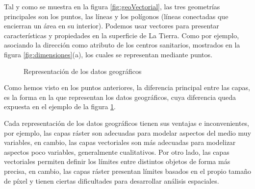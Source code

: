 \begin{itemize}
  Tal y como se muestra en la figura \ref{fig:geoVectorial}, las tres geometrías principales son los puntos, las líneas y los polígonos (líneas conectadas que encierran un área en su interior).
  Podemos usar vectores para presentar características y propiedades en la superficie de La Tierra.
  Como por ejemplo, asociando la dirección como atributo de los centros sanitarios, mostrados en la figura \ref{fig:dimensiones}(a), los cuales se representan mediante puntos.
\end{itemize}

\begin{figure}[H]
  \centering
  \caption{Representación de los datos geográficos} \label{fig:capas} 
\end{figure} 

Como hemos visto en los puntos anteriores, la diferencia principal entre las capas, es la forma en la que representan los datos geográficos, cuya diferencia queda expuesta en el ejemplo de la figura \ref{fig:capas}.

Cada representación de los datos geográficos tienen sus ventajas e inconvenientes, por ejemplo,
las capas ráster son adecuadas para modelar aspectos del medio muy variables, en cambio, 
las capas vectoriales son más adecuadas para modelizar aspectos poco variables, generalmente cualitativos.
Por otro lado, las capas vectoriales permiten definir los límites entre distintos objetos de forma más precisa, en  cambio, 
las capas ráster presentan límites basados en el propio tamaño de píxel y tienen ciertas dificultades para desarrollar análisis espaciales.

